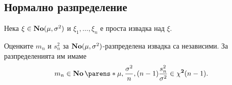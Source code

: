\documentclass{../../common/topic}
\begin{document}
\subsection{Нормално разпределение}

Нека \( \xi \in \operatorname{\mathbf{No}}(\mu, \sigma^2) \) и \( \xi_1, \ldots, \xi_n \) е проста извадка над \( \xi \).

\begin{proposition}\label{thm:normal_mean_variance_estimators_independent}
  Оценките \( m_n \) и \( s_n^2 \) за \( \operatorname{\mathbf{No}}(\mu, \sigma^2) \)-разпределена извадка са независими. За разпределенията им имаме
  \begin{equation*}
    m_n \in \distr{No} \parens*{\mu, \frac {\sigma^2} n },
    \\
    (n-1) \frac {s_n^2} {\sigma^2} \in \distr{\chi^2}(n-1).
  \end{equation*}
\end{proposition}
\end{document}
